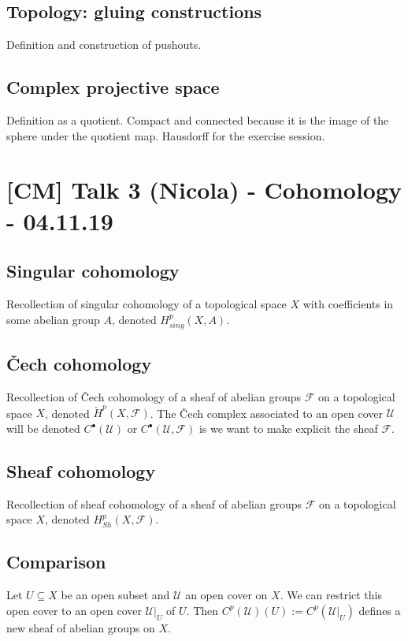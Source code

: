 \documentclass[12pt]{article}
\theoremstyle{darkgreentheorem}
\theoremstyle{darkbluedefinition}
\theoremstyle{darkredexample}
\theoremstyle{remark}
\newcommand{\1}{\mathbbm{1}}
\newcommand{\F}{\mathcal{F}}
\newcommand{\U}{\mathcal{U}}
\newcommand{\grd}{^{\bullet}}
\begin{document}
\subsection{Topology: gluing constructions}

Definition and construction of pushouts.

\subsection{Complex projective space}

Definition as a quotient.
Compact and connected because it is the image of the sphere under the quotient map.
Hausdorff for the exercise session.

\section{[CM] Talk 3 (Nicola) - Cohomology - 04.11.19}

\subsection{Singular cohomology}

Recollection of singular cohomology of a topological space $X$ with coefficients in some abelian group $A$, denoted $H^{p}_{sing}(X,A)$.

\subsection{\v{C}ech cohomology}

Recollection of \v{C}ech cohomology of a sheaf of abelian groups $\F$ on a topological space $X$, denoted $\check{H}^{p}(X,\F)$.
The \v{C}ech complex associated to an open cover $\U$ will be denoted $C\grd(\U)$ or $C\grd(\U,\F)$ is we want to make explicit the sheaf $\F$.

\subsection{Sheaf cohomology}

Recollection of sheaf cohomology of a sheaf of abelian groups $\F$ on a topological space $X$, denoted $H^{p}_{Sh}(X,\F)$.

\subsection{Comparison}

Let $U\subseteq X$ be an open subset and $\U$ an open cover on $X$.
We can restrict this open cover to an open cover $\U|_{U}$ of $U$.
Then $C^{p}(\U)(U):=C^{p}(\U|_{U})$ defines a new sheaf of abelian groups on $X$.
\end{document}
